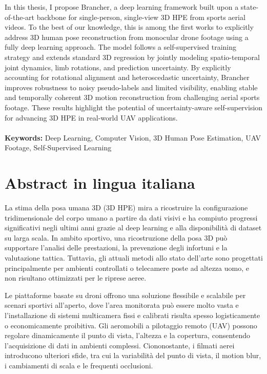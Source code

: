 \documentclass{Configuration_Files/PoliMi3i_thesis}
\begin{document}
In this thesis, I propose Brancher, a deep learning framework built upon a state-of-the-art backbone for single-person, single-view 3D HPE from sports aerial videos. To the best of our knowledge, this is among the first works to explicitly address 
3D human pose reconstruction from monocular drone footage using a fully deep learning approach. The model follows a self-supervised training strategy and extends standard 3D regression by jointly modeling spatio-temporal joint 
dynamics, limb rotations, and prediction uncertainty. By explicitly accounting for rotational alignment and heteroscedastic uncertainty, Brancher improves robustness to noisy pseudo-labels and limited visibility, enabling stable and 
temporally coherent 3D motion reconstruction from challenging aerial sports footage. These results highlight the potential of uncertainty-aware self-supervision for advancing 3D HPE in real-world UAV applications.
\\
\\
\textbf{Keywords:} Deep Learning, Computer Vision, 3D Human Pose Estimation, UAV Footage, Self-Supervised Learning %

\chapter*{Abstract in lingua italiana}
La stima della posa umana 3D (3D HPE) mira a ricostruire la configurazione tridimensionale del corpo umano a partire da dati visivi e ha compiuto progressi significativi negli 
ultimi anni grazie al deep learning e alla disponibilità di dataset su larga scala. In ambito sportivo, una ricostruzione della posa 3D può supportare l'analisi delle prestazioni, la prevenzione 
degli infortuni e la valutazione tattica. Tuttavia, gli attuali metodi allo stato dell'arte sono progettati principalmente per ambienti controllati o telecamere poste ad altezza uomo, e non risultano 
ottimizzati per le riprese aeree.

Le piattaforme basate su droni offrono una soluzione flessibile e scalabile per scenari sportivi all'aperto, dove l'area monitorata può essere molto vasta e l'installazione di sistemi multicamera fissi e 
calibrati risulta spesso logisticamente o economicamente proibitiva. Gli aeromobili a pilotaggio remoto (UAV) possono regolare dinamicamente il punto di vista, l'altezza e la copertura, consentendo 
l'acquisizione di dati in ambienti complessi. Ciononostante, i filmati aerei introducono ulteriori sfide, tra cui la variabilità del punto di vista, il motion blur, i cambiamenti di scala e le frequenti 
occlusioni.
\end{document}
